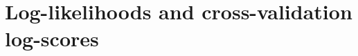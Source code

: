 \documentclass[\ifafour a4paper,12pt,\else a5paper,10pt,\fi%
onecolumn,oneside,article,%
british%
]{memoir}
\title{\propertitle}
\author{%
\hspace*{\stretch{1}}%
\parbox{0.75\linewidth}%
{\protect\centering P.G.L.  Porta Mana\\%
\footnotesize Kavli Institute, Trondheim, Norway \quad\epost{\email{pgl}{portamana.org}}}%
\hspace*{\stretch{1}}%
}
\date{\firstpublished; updated \updated}
\theoremstyle{remark}
\theoremstyle{innote}
\newcommand*{\amp}{\&}
\newcommand*{\asudedication}[1]{%
{\par\centering\textit{#1}\par}}
\renewcommand*{\|}[1][]{\nonscript\,#1\vert\nonscript\;\mathopen{}}
\begin{document}
\captiondelim{\quad}\captionnamefont{\footnotesize}\captiontitlefont{\footnotesize}
\frenchspacing
\maketitle

\abstractrunin
\abslabeldelim{}
\renewcommand*{\abstractname}{}
\setlength{\absleftindent}{0pt}
\setlength{\absrightindent}{0pt}
\setlength{\abstitleskip}{-\absparindent}
\begin{abstract}%
  \noindent It is shown that the log-likelihood of a hypothesis or model
  given some data is equal to an average of all leave-one-out
  cross-validation log-scores that can be calculated from all subsets of
  the data. This relation can be generalized to any $k$-fold
  cross-validation log-scores.
\end{abstract}
\frenchspacing





\section{Log-likelihoods and cross-validation log-scores}
\label{sec:intro}
\end{document}
